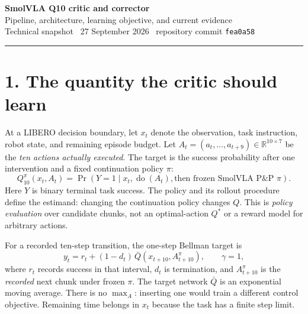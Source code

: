 \documentclass[10pt,letterpaper]{article}
\newcommand{\Q}{Q^{\pi}_{10}}
\begin{document}
\begin{flushleft}
{\Large\bfseries\color{navy} SmolVLA Q10 critic and corrector}\\[5pt]
{\large Pipeline, architecture, learning objective, and current evidence}\\[8pt]
{\small Technical snapshot \textbullet\ 27 September 2026 \textbullet\ repository commit \texttt{fea0a58}}
\end{flushleft}
\vspace{4pt}\color{teal}\rule{\linewidth}{1.2pt}\color{black}

\noindent{}

\section*{1. The quantity the critic should learn}
At a LIBERO decision boundary, let $x_t$ denote the observation, task instruction, robot state, and remaining episode budget. Let $A_t=(a_t,\ldots,a_{t+9})\in\mathbb R^{10\times 7}$ be the \emph{ten actions actually executed}. The target is the success probability after one intervention and a fixed continuation policy $\pi$:
\begin{equation}
\boxed{\Q(x_t,A_t)=\Pr\!\left(Y=1\mid x_t,\operatorname{do}(A_t),\text{then frozen SmolVLA P\&P }\pi\right).}
\end{equation}
Here $Y$ is binary terminal task success. The policy and its rollout procedure define the estimand: changing the continuation policy changes $Q$. This is \emph{policy evaluation} over candidate chunks, not an optimal-action $Q^*$ or a reward model for arbitrary actions.

For a recorded ten-step transition, the one-step Bellman target is
\begin{equation}
y_t=r_t+(1-d_t)\,\bar Q(x_{t+10},A^{\pi}_{t+10}), \qquad \gamma=1,
\end{equation}
where $r_t$ records success in that interval, $d_t$ is termination, and $A^{\pi}_{t+10}$ is the \emph{recorded} next chunk under frozen $\pi$. The target network $\bar Q$ is an exponential moving average. There is no $\max_A$: inserting one would train a different control objective. Remaining time belongs in $x_t$ because the task has a finite step limit.
\end{document}
